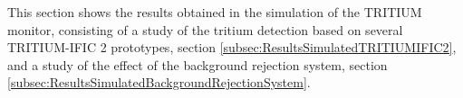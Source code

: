 This section shows the results obtained in the simulation of the TRITIUM monitor, consisting of a study of the tritium detection based on several TRITIUM-IFIC 2 prototypes, section \ref{subsec:ResultsSimulatedTRITIUMIFIC2}, and a study of the effect of the background rejection system, section \ref{subsec:ResultsSimulatedBackgroundRejectionSystem}.